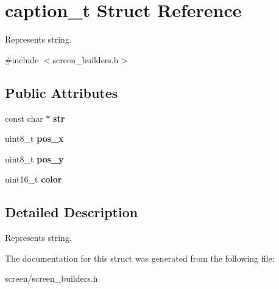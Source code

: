\hypertarget{structcaption__t}{}\section{caption\+\_\+t Struct Reference}
\label{structcaption__t}


Represents string.  




{\ttfamily \#include $<$screen\+\_\+builders.\+h$>$}

\subsection*{Public Attributes}
\begin{DoxyCompactItemize}
\item 
const char $\ast$ {\bfseries str}\hypertarget{structcaption__t_aabc04574db378aef08ed09de32df63c5}{}\label{structcaption__t_aabc04574db378aef08ed09de32df63c5}

\item 
uint8\+\_\+t {\bfseries pos\+\_\+x}\hypertarget{structcaption__t_aaeb7a46b1648bedd5d33b471a95849cf}{}\label{structcaption__t_aaeb7a46b1648bedd5d33b471a95849cf}

\item 
uint8\+\_\+t {\bfseries pos\+\_\+y}\hypertarget{structcaption__t_a7a097eab480a6f0d3310110743a7eb14}{}\label{structcaption__t_a7a097eab480a6f0d3310110743a7eb14}

\item 
uint16\+\_\+t {\bfseries color}\hypertarget{structcaption__t_aad12f5d43bb7e94d9bafca77043a15dc}{}\label{structcaption__t_aad12f5d43bb7e94d9bafca77043a15dc}

\end{DoxyCompactItemize}


\subsection{Detailed Description}
Represents string. 

The documentation for this struct was generated from the following file\+:\begin{DoxyCompactItemize}
\item 
screen/screen\+\_\+builders.\+h\end{DoxyCompactItemize}
